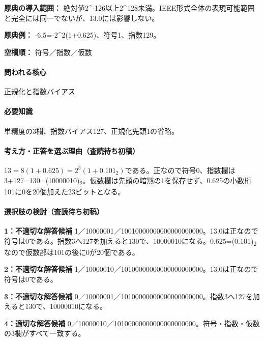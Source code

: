 \noindent\textbf{原典の導入範囲：} 絶対値2\textasciicircum{}-126以上2\textasciicircum{}128未満。IEEE形式全体の表現可能範囲と完全には同一でないが、13.0には影響しない。\par

\noindent\textbf{原典例：} -6.5=-2\textasciicircum{}2(1+0.625)、符号1、指数129。\par

\noindent\textbf{空欄順：} 符号／指数／仮数\par

\paragraph{問われる核心} 正規化と指数バイアス

\paragraph{必要知識} 単精度の3欄、指数バイアス127、正規化先頭1の省略。

\paragraph{考え方・正答を選ぶ理由（査読待ち初稿）} \(13=8(1+0.625)=2^3(1+0.101_2)\)である。正なので符号0、指数欄は3+127=\allowbreak{}130=\allowbreak{}(10000010)\textsubscript{2}。仮数欄は先頭の暗黙の1を保存せず、0.625の小数桁101に0を20個加えた23ビットとなる。

\paragraph{選択肢の検討（査読待ち初稿）}\mbox{}\par

\noindent\textbf{1：不適切な解答候補} 1／10000001／10010000000000000000000。13.0は正なので符号は0である。指数3へ127を加えると130で、10000010になる。0.625=\allowbreak{}(0.101)\textsubscript{2}なので仮数部は101の後に0が20個である。\par

\noindent\textbf{2：不適切な解答候補} 1／10000010／10100000000000000000000。13.0は正なので符号は0である。\par

\noindent\textbf{3：不適切な解答候補} 0／10000001／10100000000000000000000。指数3へ127を加えると130で、10000010になる。\par

\noindent\textbf{4：適切な解答候補} 0／10000010／10100000000000000000000。符号・指数・仮数の3欄がすべて一致する。\par

